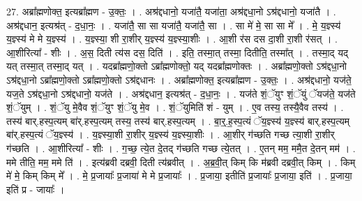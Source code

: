 \documentclass[17pt]{extarticle}
\begin{document}
27. अब्रा᳚ह्मणोक्त॒ इत्यब्रा᳚ह्मण - उ॒क्तः॒ । . अश्र॑द्दधानो॒ यजा॑तै॒ यजा॑ता॒ अश्र॑द्दधा॒नो ऽश्र॑द्दधानो॒ यजा॑तै । . अश्र॑द्दधान॒ इत्यश्र॑त् - द॒धा॒नः॒ । . यजा॑तै॒ सा सा यजा॑तै॒ यजा॑तै॒ सा । . सा मे॑ मे॒ सा सा मे᳚ । . मे॒ य॒ज्ञ्स्य॑ य॒ज्ञ्स्य॑ मे मे य॒ज्ञ्स्य॑ । . य॒ज्ञ्स्या॒ शी रा॒शीर् य॒ज्ञ्स्य॑ य॒ज्ञ्स्या॒शीः । . आ॒शी र॑स दस दा॒शी रा॒शी र॑सत् । . आ॒शीरित्या᳚ - शीः । . अ॒स॒ दिती त्य॑स दस॒ दिति॑ । . इति॒ तस्मा॒त् तस्मा॒ दितीति॒ तस्मा᳚त् । . तस्मा॒द् यद् यत् तस्मा॒त् तस्मा॒द् यत् । . यदब्रा᳚ह्मणो॒क्तो ऽब्रा᳚ह्मणोक्तो॒ यद् यदब्रा᳚ह्मणोक्तः । . अब्रा᳚ह्मणो॒क्तो ऽश्र॑द्दधा॒नो ऽश्र॑द्दधा॒नो ऽब्रा᳚ह्मणो॒क्तो ऽब्रा᳚ह्मणो॒क्तो ऽश्र॑द्दधानः । . अब्रा᳚ह्मणोक्त॒ इत्यब्रा᳚ह्मण - उ॒क्तः॒ । . अश्र॑द्दधानो॒ यज॑ते॒ यज॒ते ऽश्र॑द्दधा॒नो ऽश्र॑द्दधानो॒ यज॑ते । . अश्र॑द्दधान॒ इत्यश्र॑त् - द॒धा॒नः॒ । . यज॑ते शं॒ॅयुꣳ शं॒ॅयुं ॅयज॑ते॒ यज॑ते शं॒ॅयुम् । . शं॒ॅयु मे॒वैव शं॒ॅयुꣳ शं॒ॅयु मे॒व । . शं॒ॅयुमिति॑ शं - युम् । . ए॒व तस्य॒ तस्यै॒वैव तस्य॑ । . तस्य॑ बार्.हस्प॒त्यम् बा॑र्.हस्प॒त्यम् तस्य॒ तस्य॑ बार्.हस्प॒त्यम् । . बा॒र्॒.ह॒स्प॒त्यं ॅय॒ज्ञ्स्य॑ य॒ज्ञ्स्य॑ बार्.हस्प॒त्यम् बा॑र्.हस्प॒त्यं ॅय॒ज्ञ्स्य॑ । . य॒ज्ञ्स्या॒शी रा॒शीर् य॒ज्ञ्स्य॑ य॒ज्ञ्स्या॒शीः । . आ॒शीर् ग॑च्छति गच्छ त्या॒शी रा॒शीर् ग॑च्छति । . आ॒शीरित्या᳚ - शीः । . ग॒च्छ॒ त्ये॒त दे॒तद् ग॑च्छति गच्छ त्ये॒तत् । . ए॒तन् मम॒ ममै॒त दे॒तन् मम॑ । . ममे तीति॒ मम॒ ममे ति॑ । . इत्य॑ब्रवी दब्रवी॒ दिती त्य॑ब्रवीत् । . अ॒ब्र॒वी॒त् किम् कि म॑ब्रवी दब्रवी॒त् किम् । . किम् मे॑ मे॒ किम् किम् मे᳚ । . मे॒ प्र॒जायाः᳚ प्र॒जाया॑ मे मे प्र॒जायाः᳚ । . प्र॒जाया॒ इतीति॑ प्र॒जायाः᳚ प्र॒जाया॒ इति॑ । . प्र॒जाया॒ इति॑ प्र - जायाः᳚ । \newline
\end{document}
